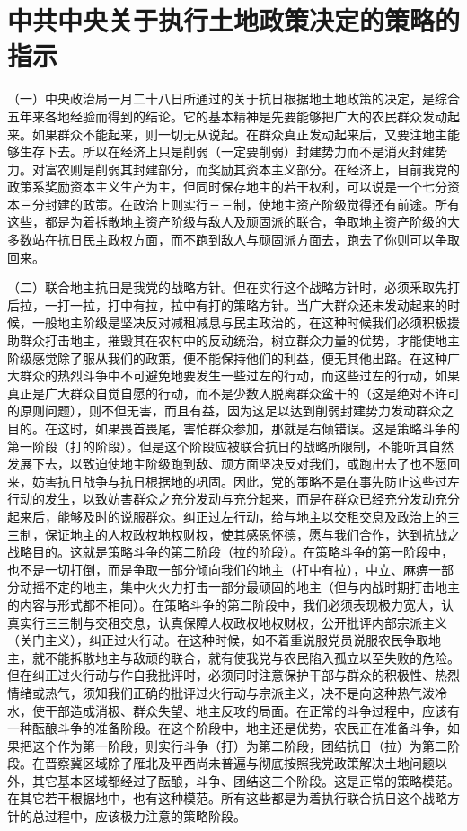 \section[中共中央关于执行土地政策决定的策略的指示（一九四二年二月四日）]{中共中央关于执行土地政策决定的策略的指示}


（一）中央政治局一月二十八日所通过的关于抗日根据地土地政策的决定，是综合五年来各地经验而得到的结论。它的基本精神是先要能够把广大的农民群众发动起来。如果群众不能起来，则一切无从说起。在群众真正发动起来后，又要注地主能够生存下去。所以在经济上只是削弱（一定要削弱）封建势力而不是消灭封建势力。对富农则是削弱其封建部分，而奖励其资本主义部分。在经济上，目前我党的政策系奖励资本主义生产为主，但同时保存地主的若干权利，可以说是一个七分资本三分封建的政策。在政治上则实行三三制，使地主资产阶级觉得还有前途。所有这些，都是为着拆散地主资产阶级与敌人及顽固派的联合，争取地主资产阶级的大多数站在抗日民主政权方面，而不跑到敌人与顽固派方面去，跑去了你则可以争取回来。

（二）联合地主抗日是我党的战略方针。但在实行这个战略方针时，必须釆取先打后拉，一打一拉，打中有拉，拉中有打的策略方针。当广大群众还未发动起来的时候，一般地主阶级是坚决反对减租减息与民主政治的，在这种时候我们必须积极援助群众打击地主，摧毁其在农村中的反动统治，树立群众力量的优势，才能使地主阶级感觉除了服从我们的政策，便不能保持他们的利益，便无其他出路。在这种广大群众的热烈斗争中不可避免地要发生一些过左的行动，而这些过左的行动，如果真正是广大群众自觉自愿的行动，而不是少数入脱离群众蛮干的（这是绝对不许可的原则问题），则不但无害，而且有益，因为这足以达到削弱封建势力发动群众之目的。在这时，如果畏首畏尾，害怕群众参加，那就是右倾错误。这是策略斗争的第一阶段（打的阶段）。但是这个阶段应被联合抗日的战略所限制，不能听其自然发展下去，以致迫使地主阶级跑到敌、顽方面坚决反对我们，或跑出去了也不愿回来，妨害抗日战争与抗日根据地的巩固。因此，党的策略不是在事先防止这些过左行动的发生，以致妨害群众之充分发动与充分起来，而是在群众已经充分发动充分起来后，能够及时的说服群众。纠正过左行动，给与地主以交租交息及政治上的三三制，保证地主的人权政权地权财权，使其感恩怀德，愿与我们合作，达到抗战之战略目的。这就是策略斗争的第二阶段（拉的阶段）。在策略斗争的第一阶段中，也不是一切打倒，而是争取一部分倾向我们的地主（打中有拉），中立、麻痹一部分动摇不定的地主，集中火火力打击一部分最顽固的地主（但与内战时期打击地主的内容与形式都不相同）。在策略斗争的第二阶段中，我们必须表现极力宽大，认真实行三三制与交租交息，认真保障人权政权地权财权，公开批评内部宗派主义（关门主义），纠正过火行动。在这种时候，如不着重说服党员说服农民争取地主，就不能拆散地主与敌顽的联合，就有使我党与农民陷入孤立以至失败的危险。但在纠正过火行动与作自我批评时，必须同时注意保护干部与群众的积极性、热烈情绪或热气，须知我们正确的批评过火行动与宗派主义，决不是向这种热气泼冷水，使干部造成消极、群众失望、地主反攻的局面。在正常的斗争过程中，应该有一种酝酿斗争的准备阶段。在这个阶段中，地主还是优势，农民正在准备斗争，如果把这个作为第一阶段，则实行斗争（打）为第二阶段，团结抗日（拉）为第二阶段。在晋察冀区域除了雁北及平西尚未普遍与彻底按照我党政策解决土地问题以外，其它基本区域都经过了酝酿，斗争、团结这三个阶段。这是正常的策略模范。在其它若干根据地中，也有这种模范。所有这些都是为着执行联合抗日这个战略方针的总过程中，应该极力注意的策略阶段。

